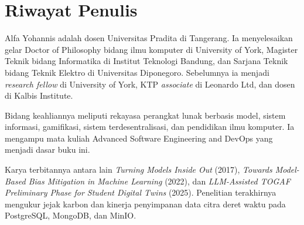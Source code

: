 \chapter{Riwayat Penulis}

Alfa Yohannis adalah dosen Universitas Pradita di Tangerang. Ia menyelesaikan gelar Doctor of Philosophy bidang ilmu komputer di University of York, Magister Teknik bidang Informatika di Institut Teknologi Bandung, dan Sarjana Teknik bidang Teknik Elektro di Universitas Diponegoro. Sebelumnya ia menjadi \textit{research fellow} di University of York, KTP \textit{associate} di Leonardo Ltd, dan dosen di Kalbis Institute.

Bidang keahliannya meliputi rekayasa perangkat lunak berbasis model, sistem informasi, gamifikasi, sistem terdesentralisasi, dan pendidikan ilmu komputer. Ia mengampu mata kuliah Advanced Software Engineering and DevOps yang menjadi dasar buku ini.

Karya terbitannya antara lain \textit{Turning Models Inside Out} (2017), \textit{Towards Model-Based Bias Mitigation in Machine Learning} (2022), dan \textit{LLM-Assisted TOGAF Preliminary Phase for Student Digital Twins} (2025). Penelitian terakhirnya mengukur jejak karbon dan kinerja penyimpanan data citra deret waktu pada PostgreSQL, MongoDB, dan MinIO.
